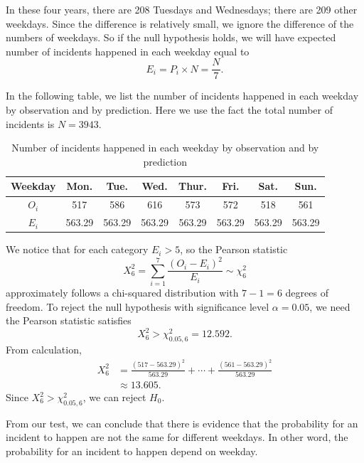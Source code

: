 \documentclass[11pt,a4paper,english]{article}
\begin{document}
In these four years, there are 208  Tuesdays and Wednesdays; there are 209 other weekdays. 
Since the difference is relatively small, we ignore the difference of the numbers of weekdays.
So if the null hypothesis holds, we will have expected number of incidents happened in each weekday equal to
\begin{equation*}
	E_{i} = P_{i} \times N = \frac{N}{7}.
\end{equation*}

In the following table, we list the number of incidents happened in each weekday by observation and by prediction. 
Here we use the fact the total number of incidents is $N = 3943$.
\begin{table}[htbp]
	\centering
	\begin{tabular}{c|ccccccc}
		\hline
		Weekday & Mon. & Tue. & Wed. & Thur. & Fri. & Sat. & Sun.\\
		\hline
		$O_{i}$ & 517 & 586 & 616 & 573 & 572 & 518 & 561\\ \hline
		$E_{i}$ & 563.29 & 563.29 & 563.29 & 563.29 & 563.29 & 563.29 & 563.29\\
		\hline
	\end{tabular}
	\caption{Number of incidents happened in each weekday by observation and by prediction}
\end{table}

We notice that for each category $E_{i} > 5$, so the Pearson statistic
\begin{equation*}
	X^{2}_{6} = \sum_{i = 1}^{7}\frac{(O_{i} - E_{i})^{2}}{E_{i}}
	\sim \chi^{2}_{6}
\end{equation*}
approximately follows a chi-squared distribution with $7-1 = 6$ degrees of freedom. 
To reject the null hypothesis with significance level $\alpha = 0.05$, we need the Pearson statistic satisfies
\begin{equation*}
	X^{2}_{6} > \chi^{2}_{0.05,6} = 12.592.
\end{equation*}
From calculation,
\begin{align*}
	X^{2}_{6} &= \frac{(517-563.29)^{2}}{563.29}+\cdots+\frac{(561-563.29)^{2}}{563.29}\\
	&\approx 13.605.
\end{align*}
Since $X^{2}_{6} > \chi^{2}_{0.05,6}$, we can reject $H_{0}$.

From our test, we can conclude that there is evidence that the probability for an incident to happen are not the same for different weekdays. In other word, the probability for an incident to happen depend on weekday.
\end{document}
